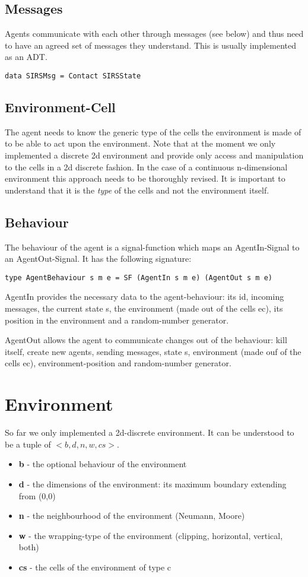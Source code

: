 \subsection{Messages}
Agents communicate with each other through messages (see below) and thus need to have an agreed set of messages they understand. This is usually implemented as an ADT.
\begin{lstlisting}[]
data SIRSMsg = Contact SIRSState
\end{lstlisting}

\subsection{Environment-Cell}
The agent needs to know the generic type of the cells the environment is made of to be able to act upon the environment. Note that at the moment we only implemented a discrete 2d environment and provide only access and manipulation to the cells in a 2d discrete fashion. In the case of a continuous n-dimensional environment this approach needs to be thoroughly revised. It is important to understand that it is the \textit{type} of the cells and not the environment itself.

\subsection{Behaviour}
The behaviour of the agent is a signal-function which maps an AgentIn-Signal to an AgentOut-Signal. It has the following signature: 
\begin{lstlisting}[]
type AgentBehaviour s m e = SF (AgentIn s m e) (AgentOut s m e)
\end{lstlisting}

AgentIn provides the necessary data to the agent-behaviour: its id, incoming messages, the current state s, the environment (made out of the cells ec), its position in the environment and a random-number generator. 

AgentOut allows the agent to communicate changes out of the behaviour: kill itself, create new agents, sending messages, state s, environment (made ouf of the cells ec), environment-position and random-number generator. 

\section{Environment}
So far we only implemented a 2d-discrete environment. It can be understood to be a tuple of $<b, d, n, w, cs>$.
\begin{itemize}
	\item \textbf{b} - the optional behaviour of the environment
	\item \textbf{d} - the dimensions of the environment: its maximum boundary extending from (0,0)
	\item \textbf{n} - the neighbourhood of the environment (Neumann, Moore)
	\item \textbf{w} - the wrapping-type of the environment (clipping, horizontal, vertical, both)
	\item \textbf{cs} - the cells of the environment of type c
\end{itemize}

